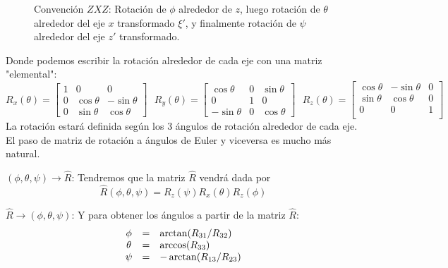 \documentclass[]{article}
\numberwithin{equation}{section}
\begin{document}
\begin{figure}[h!]
	\caption{Convención \(ZXZ\): Rotación de \(\phi\) alrededor de \(z\), luego rotación de \(\theta\) alrededor del eje \(x\) transformado \(\xi'\), y finalmente rotación de \(\psi\) alrededor del eje \(z'\) transformado.}
\end{figure}

Donde podemos escribir la rotación alrededor de cada eje con una matriz "elemental":
\begin{equation}
	R_{x}(\theta) = \begin{bmatrix}
		1 & 0          & 0           \\
		0 & \cos\theta & -\sin\theta \\
		0 & \sin\theta & \cos\theta
	\end{bmatrix}~~~ R_{y}(\theta) = \begin{bmatrix}
		\cos\theta  &0 & \sin\theta \\
		0           &1 & 0          \\
		-\sin\theta &0 & \cos\theta
	\end{bmatrix}~~~ R_{z}(\theta) = \begin{bmatrix}
		\cos\theta  & -\sin\theta & 0 \\
		\sin\theta  & \cos\theta  & 0 \\
		0           & 0           & 1 \\
	\end{bmatrix}
\end{equation}
La rotación estará definida según los 3 ángulos de rotación alrededor de cada eje. El paso de matriz de rotación a ángulos de Euler y viceversa es mucho más natural.

\((\phi,\theta,\psi) \rightarrow \hat{R}\): Tendremos que la matriz \(\hat{R}\) vendrá dada por
\begin{equation}
	\hat{R}(\phi,\theta,\psi) = R_{z}(\psi)R_{x}(\theta)R_{z}(\phi)
\end{equation}

\(\hat{R} \rightarrow (\phi,\theta,\psi)\): Y para obtener los ángulos a partir de la matriz \(\hat{R}\):
\begin{equation}
	\begin{matrix}
		\phi   &=& \arctan(R_{31}/R_{32}) \hfill   \\
		\theta &=& \arccos(R_{33}) \hfill          \\
		\psi   &=& - \arctan(R_{13}/R_{23}) \hfill 
	\end{matrix}
\end{equation}
\end{document}
